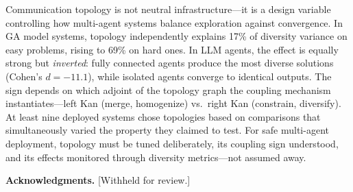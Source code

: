 \documentclass[10pt,twocolumn]{article}
\begin{document}
Communication topology is not neutral infrastructure---it is a design
variable controlling how multi-agent systems balance exploration
against convergence. In GA model systems, topology independently
explains 17\% of diversity variance on easy problems, rising to 69\%
on hard ones. In LLM agents, the effect is equally strong but
\emph{inverted}: fully connected agents produce the most diverse
solutions (Cohen's $d = -11.1$), while isolated agents converge to
identical outputs. The sign depends on which adjoint of the topology
graph the coupling mechanism instantiates---left Kan (merge,
homogenize) vs.\ right Kan (constrain, diversify). At least nine
deployed systems chose topologies based on comparisons that
simultaneously varied the property they claimed to test. For safe
multi-agent deployment, topology must be tuned deliberately, its
coupling sign understood, and its effects monitored through diversity
metrics---not assumed away.

\smallskip
\noindent\textbf{Acknowledgments.} [Withheld for review.]

\end{document}
